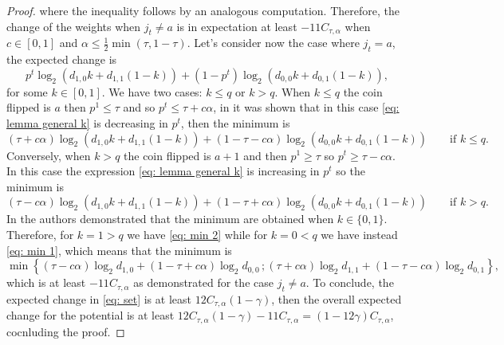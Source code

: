 \begin{proof}
where the inequality follows by an analogous computation.
Therefore, the change of the weights when $j_t \neq a$ is in expectation at least $-11 C_{\tau,\alpha}$ when $c\in [0,1]$ and $\alpha \leq \frac{1}{2}\min(\tau, 1-\tau)$.
Let's consider now the case where $j_{t} = a$, the expected change is
\begin{equation}
\label{eq: lemma general k}
    p^t\log_2(d_{1,0}k+d_{1,1}(1-k))+(1-p^t)\log_2(d_{0,0}k+d_{0,1}(1-k)),
\end{equation}
for some $k\in [0,1]$. We have two cases: $k\leq q$ or $k>q$. When $k\leq q$ the coin flipped is $a$ then $p^1\leq \tau$ and so $p^{t}\leq \tau+c\alpha$, in \cite{gretta2023sharp} it was shown that in this case \autoref{eq: lemma general k} is decreasing in $p^t$, then the minimum is 
\begin{equation}
\label{eq: min 1}
    (\tau+c\alpha)\log_2(d_{1,0}k+d_{1,1}(1-k))+(1-\tau-c\alpha)\log_2(d_{0,0}k+d_{0,1}(1-k)) 
\qquad \text{if } k\leq q.
\end{equation}
Conversely, when $k>q$ the coin flipped is $a+1$ and then $p^1\geq \tau$ so $p^t\geq \tau-c\alpha$. In this case the expression \eqref{eq: lemma general k} is increasing in $p^t$ so the minimum is
\begin{equation}
\label{eq: min 2}
    (\tau-c\alpha)\log_2(d_{1,0}k+d_{1,1}(1-k))+(1-\tau+c\alpha)\log_2(d_{0,0}k+d_{0,1}(1-k)) 
\qquad \text{if } k> q.
\end{equation}
In \cite{gretta2023sharp} the authors demonstrated that the minimum are obtained when $k\in \{0,1\}$. Therefore, for $k=1> q$ we have \autoref{eq: min 2} while for $k=0< q$ we have instead \autoref{eq: min 1}, which means that the minimum is
\begin{equation*}
    \min\left\{(\tau-c\alpha) \log_2 d_{1,0} +(1-\tau+c\alpha) \log_2 d_{0,0}\,;(\tau+c\alpha) \log_2 d_{1,1} +(1-\tau-c\alpha) \log_2 d_{0,1}\right\},
\end{equation*}
which is at least $-11 C_{\tau, \alpha}$ as demonstrated for the case $j_t \neq a$.
To conclude, the expected change in \autoref{eq: set} is at least $12 C_{\tau, \alpha}(1-\gamma)$, then the overall expected change for the potential is at least $12 C_{\tau, \alpha}(1-\gamma)-11C_{\tau, \alpha} = (1-12 \gamma)C_{\tau, \alpha}$, cocnluding the proof.
\end{proof}


